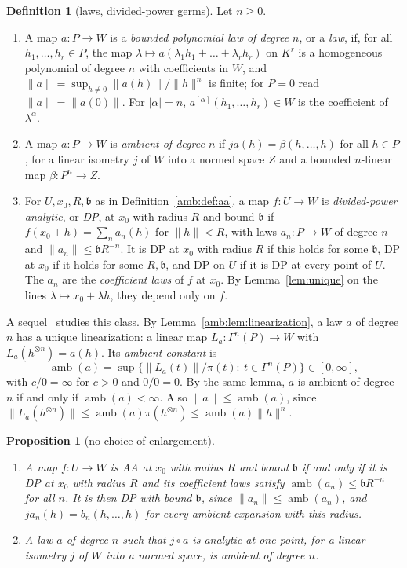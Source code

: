 \documentclass[11pt]{amsart}
\newtheorem{proposition}[theorem]{Proposition}
\theoremstyle{definition}
\newtheorem{definition}[theorem]{Definition}
\theoremstyle{remark}
\numberwithin{equation}{section}
\newcommand{\abs}[1]{\lvert #1\rvert}
\newcommand{\norm}[1]{\lVert #1\rVert}
\theoremstyle{plain}
\theoremstyle{definition}
\theoremstyle{plain}
\begin{document}
\begin{definition}[laws, divided-power germs]\label{amb:def:law}
Let $n\ge0$.
\begin{enumerate}
\item A map $a\colon P\to W$ is a \emph{bounded polynomial law of degree $n$}, or a \emph{law}, if, for all $h_1,\dots,h_r\in P$, the map $\lambda\mapsto a(\lambda_1h_1+\dots+\lambda_rh_r)$ on $K^r$ is a homogeneous polynomial of degree $n$ with coefficients in $W$, and $\norm a=\sup_{h\ne0}\norm{a(h)}/\norm h^n$ is finite; for $P=0$ read $\norm a=\norm{a(0)}$. For $\abs\alpha=n$, $a^{[\alpha]}(h_1,\dots,h_r)\in W$ is the coefficient of $\lambda^\alpha$.
\item A map $a\colon P\to W$ is \emph{ambient of degree $n$} if $ja(h)=\beta(h,\dots,h)$ for all $h\in P$, for a linear isometry $j$ of $W$ into a normed space $Z$ and a bounded $n$-linear map $\beta\colon P^n\to Z$.
\item For $U,x_0,R,\mathfrak b$ as in Definition~\ref{amb:def:aa}, a map $f\colon U\to W$ is \emph{divided-power analytic}, or \emph{DP}, at $x_0$ with radius $R$ and bound $\mathfrak b$ if $f(x_0+h)=\sum_na_n(h)$ for $\norm h<R$, with laws $a_n\colon P\to W$ of degree $n$ and $\norm{a_n}\le \mathfrak bR^{-n}$. It is DP at $x_0$ with radius $R$ if this holds for some $\mathfrak b$, DP at $x_0$ if it holds for some $R,\mathfrak b$, and DP on $U$ if it is DP at every point of $U$. The $a_n$ are the \emph{coefficient laws} of $f$ at $x_0$. By Lemma~\ref{lem:unique} on the lines $\lambda\mapsto x_0+\lambda h$, they depend only on $f$.
\end{enumerate}
\end{definition}

A sequel~\cite{II} studies this class. By Lemma~\ref{amb:lem:linearization}, a law $a$ of degree $n$ has a unique linearization: a linear map $L_a\colon\Gamma^n(P)\to W$ with $L_a(h^{\otimes n})=a(h)$. Its \emph{ambient constant} is
\[
 \operatorname{amb}(a)=\sup\{\norm{L_a(t)}/\pi(t):\ t\in\Gamma^n(P)\}\in[0,\infty],
\]
with $c/0=\infty$ for $c>0$ and $0/0=0$. By the same lemma, $a$ is ambient of degree $n$ if and only if $\operatorname{amb}(a)<\infty$. Also $\norm a\le\operatorname{amb}(a)$, since $\norm{L_a(h^{\otimes n})}\le\operatorname{amb}(a)\pi(h^{\otimes n})\le\operatorname{amb}(a)\norm h^n$.

\begin{proposition}[no choice of enlargement]\label{amb:prop:criterion}
\leavevmode
\begin{enumerate}
\item A map $f\colon U\to W$ is AA at $x_0$ with radius $R$ and bound $\mathfrak b$ if and only if it is DP at $x_0$ with radius $R$ and its coefficient laws satisfy $\operatorname{amb}(a_n)\le \mathfrak bR^{-n}$ for all $n$. It is then DP with bound $\mathfrak b$, since $\norm{a_n}\le\operatorname{amb}(a_n)$, and $ja_n(h)=b_n(h,\dots,h)$ for every ambient expansion with this radius.
\item A law $a$ of degree $n$ such that $j\circ a$ is analytic at one point, for a linear isometry $j$ of $W$ into a normed space, is ambient of degree $n$.
\end{enumerate}
\end{proposition}
\end{document}
